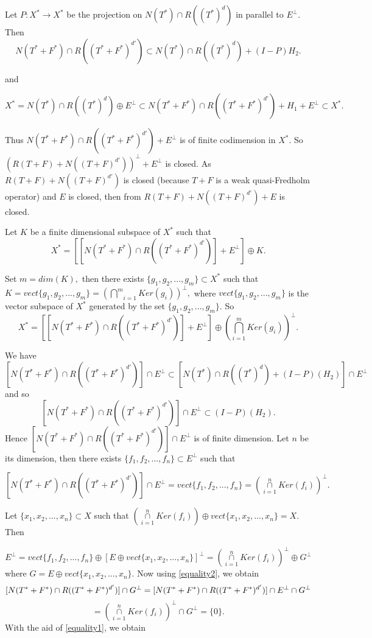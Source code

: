 \documentclass[10pt]{article}
\numberwithin{equation}{section}
\begin{document}
Let $ P: X^* \rightarrow X^*$ be the projection on $ N(T^*) \cap R((T^*)^{d})$ in parallel to $E^{\bot}.$  Then $$ N(T^*+F^*) \cap R((T^*+F^*)^{d'})  \subset  N(T^*) \cap R((T^*)^{d})   +(I-P) H_2. $$ 

and  


 $$X^*=  N(T^*) \cap R((T^*)^{d})  \oplus E^{\bot}  \subset N(T^*+F^*) \cap R((T^*+F^*)^{d'})   + H_1 + E^{\bot}\subset X^*. $$


Thus $ N(T^*+F^*)\cap R((T^*+F^*)^{d'})  + E^{\bot}$  is of finite codimension in $X^*.$   So $(R(T+F) + N((T+F)^{d'}))^{\bot}+ E^{\bot} $ is closed.  
As $R(T+F) + N((T+F)^{d'})$ is closed (because  $T+F$ is a weak quasi-Fredholm operator)   and $E$ is closed,  then from \cite[Theorem 13]{MU}  
$R(T+F) + N((T+F)^{d'})+E$ is closed. 

Let $K$ be  a finite dimensional subspace of $X^*$ such that  
\begin{equation}\label{equality1}
X^* =[ [ N(T^*+F^*) \cap R((T^*+F^*)^{d'})] + E^{\bot}] \oplus K. 
\end{equation}


 Set $ m=dim(K),$ then  there exists  $ \{g_1, g_2,..., g_m\} \subset X^*$  such that 
 $K= vect\{g_1, g_2,..., g_m\}= (\underset{i=1}{\overset{m}{\bigcap}} Ker(g_i))^{\bot},$  where $vect\{g_1, g_2,..., g_m\}$ is the vector subspace of $X^*$  generated by the set $\{g_1, g_2,..., g_m\}.$  So $$ X^* =[ [ N(T^*+F^*) \cap R((T^*+F^*)^{d'})] + E^{\bot}] \oplus (\underset{i=1}{\overset{m}{\bigcap}} Ker(g_i))^{\bot}.$$


We have $$[ N(T^*+F^*) \cap R((T^*+F^*)^{d'})] \cap E^{\bot} \subset [N(T^*) \cap R((T^*)^{d})   + (I-P)(H_2)]\cap E^{\bot} $$ and so  $$[ N(T^*+F^*) \cap R((T^*+F^*)^{d'})] \cap E^{\bot}  \subset  (I-P)(H_2). $$
Hence $[ N(T^*+F^*) \cap R((T^*+F^*)^{d'})] \cap E^{\bot}$ is of finite dimension. Let $n$ be its dimension,  then  there exists  $ \{f_1, f_2,..., f_n\} \subset E^{\bot}$  such that 

\begin{equation} \label{equality2}
[ N(T^*+F^*) \cap R((T^*+F^*)^{d'})] \cap E^{\bot}= vect\{f_1, f_2,..., f_n\}= (\underset{i=1}{\overset{n}{\cap}} Ker(f_i))^{\bot}. 
\end{equation} 
  
  
  
  Let $ \{x_1, x_2, ..., x_n\} \subset X $ such that  $ (\underset{i=1}{\overset{n}{\cap}} Ker(f_i)) \oplus vect\{x_1, x_2, ..., x_n\} = X.$ 
Then 

$$ E^{\bot} = vect\{f_1, f_2,..., f_n\} \oplus [E \oplus vect\{x_1, x_2, ..., x_n\}]^{\bot}= (\underset{i=1}{\overset{n}{\cap}} Ker(f_i))^{\bot} \oplus G^{\bot} $$ 
  where  $ G= E \oplus vect\{x_1, x_2, ..., x_n\}.$ Now using \ref{equality2}, we obtain  $$ [ N(T^*+F^*) \cap R((T^*+F^*)^{d'})] \cap G^{\bot}=    [ N(T^*+F^*) \cap R((T^*+F^*)^{d'})] \cap E^{\bot} \cap G^{\bot}\\$$$$=  (\underset{i=1}{\overset{n}{\cap}} Ker(f_i))^{\bot} \cap G^{\bot} = \{0\}. $$   With the aid of   \ref{equality1}, we obtain
  
\end{document}

